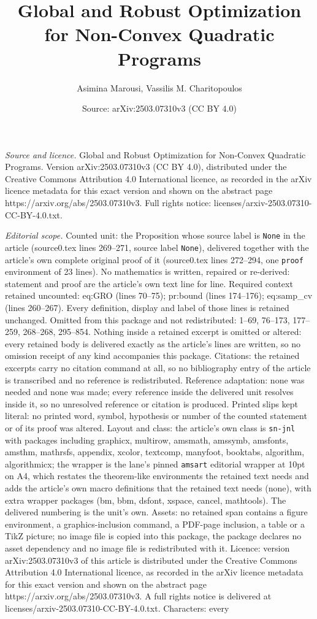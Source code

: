 \documentclass[10pt,a4paper]{amsart}
\title[Global and Robust Optimization for Non-Convex Quadratic Prog]{Global and Robust Optimization for Non-Convex Quadratic Programs}
\author{Asimina Marousi, Vassilis M. Charitopoulos}
\date{Source: arXiv:2503.07310v3 (CC BY 4.0)}
\begin{document}
\maketitle

\noindent\emph{Source and licence.} Global and Robust Optimization for Non-Convex Quadratic Programs. Version arXiv:2503.07310v3 (CC BY 4.0), distributed under the Creative Commons Attribution 4.0 International licence, as recorded in the arXiv licence metadata for this exact version and shown on the abstract page https://arxiv.org/abs/2503.07310v3. Full rights notice: licenses/arxiv-2503.07310-CC-BY-4.0.txt.\par\smallskip

\noindent\textit{Editorial scope.} Counted unit: the Proposition whose source label is \texttt{None} in the article (source0.tex lines 269--271, source label \texttt{None}), delivered together with the article's own complete original proof of it (source0.tex lines 272--294, one \texttt{proof} environment of 23 lines). No mathematics is written, repaired or re-derived: statement and proof are the article's own text line for line. Required context retained uncounted: eq:GRO (lines 70--75); pr:bound (lines 174--176); eq:samp\_cv (lines 260--267). Every definition, display and label of those lines is retained unchanged. Omitted from this package and not redistributed: 1--69, 76--173, 177--259, 268--268, 295--854. Nothing inside a retained excerpt is omitted or altered: every retained body is delivered exactly as the article's lines are written, so no omission receipt of any kind accompanies this package. Citations: the retained excerpts carry no citation command at all, so no bibliography entry of the article is transcribed and no reference is redistributed. Reference adaptation: none was needed and none was made; every reference inside the delivered unit resolves inside it, so no unresolved reference or citation is produced. Printed slips kept literal: no printed word, symbol, hypothesis or number of the counted statement or of its proof was altered. Layout and class: the article's own class is \texttt{sn-jnl} with packages including graphicx, multirow, amsmath, amssymb, amsfonts, amsthm, mathrsfs, appendix, xcolor, textcomp, manyfoot, booktabs, algorithm, algorithmicx; the wrapper is the lane's pinned \texttt{amsart} editorial wrapper at 10pt on A4, which restates the theorem-like environments the retained text needs and adds the article's own macro definitions that the retained text needs (none), with extra wrapper packages (bm, bbm, dsfont, xspace, cancel, mathtools). The delivered numbering is the unit's own. Assets: no retained span contains a figure environment, a graphics-inclusion command, a PDF-page inclusion, a table or a TikZ picture; no image file is copied into this package, the package declares no asset dependency and no image file is redistributed with it. Licence: version arXiv:2503.07310v3 of this article is distributed under the Creative Commons Attribution 4.0 International licence, as recorded in the arXiv licence metadata for this exact version and shown on the abstract page https://arxiv.org/abs/2503.07310v3. A full rights notice is delivered at licenses/arxiv-2503.07310-CC-BY-4.0.txt. Characters: every 
\end{document}
